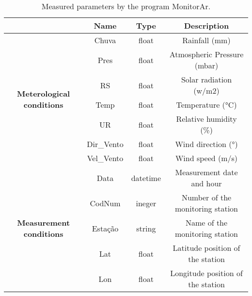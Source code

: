 \begin{table*}[t]
    \centering
    \begin{tabular}{c|c|c|c|}
        \cline{2-4}
       & \textbf{Name} & \textbf{Type} & \textbf{Description}              \\ \hline
        \multicolumn{1}{|c|}{\multirow{7}{*}{\textbf{Meterological conditions}}} & Chuva         & float         & Rainfall (mm)                     \\ \cline{2-4} 
        \multicolumn{1}{|c|}{}                                                   & Pres          & float         & Atmospheric Pressure (mbar)       \\ \cline{2-4} 
        \multicolumn{1}{|c|}{}                                                   & RS            & float         & Solar radiation (w/m2)            \\ \cline{2-4} 
        \multicolumn{1}{|c|}{}                                                   & Temp          & float         & Temperature (°C)                  \\ \cline{2-4} 
        \multicolumn{1}{|c|}{}                                                   & UR            & float         & Relative humidity (\%)            \\ \cline{2-4} 
        \multicolumn{1}{|c|}{}                                                   & Dir\_Vento    & float         & Wind direction (°)                \\ \cline{2-4} 
        \multicolumn{1}{|c|}{}                                                   & Vel\_Vento    & float         & Wind speed (m/s)                  \\ \hline
        \multicolumn{1}{|c|}{\multirow{5}{*}{\textbf{Measurement conditions}}}   & Data          & datetime      & Measurement date and hour         \\ \cline{2-4} 
        \multicolumn{1}{|c|}{}                                                   & CodNum        & ineger        & Number of the monitoring station  \\ \cline{2-4} 
        \multicolumn{1}{|c|}{}                                                   & Estação       & string        & Name of the monitoring station    \\ \cline{2-4} 
        \multicolumn{1}{|c|}{}                                                   & Lat           & float         & Latitude position of the station  \\ \cline{2-4} 
        \multicolumn{1}{|c|}{}                                                   & Lon           & float         & Longitude position of the station \\ \hline
        \end{tabular}
    \caption{Measured parameters by the program MonitorAr.}
    \label{tab:measured-data}
\end{table*}

